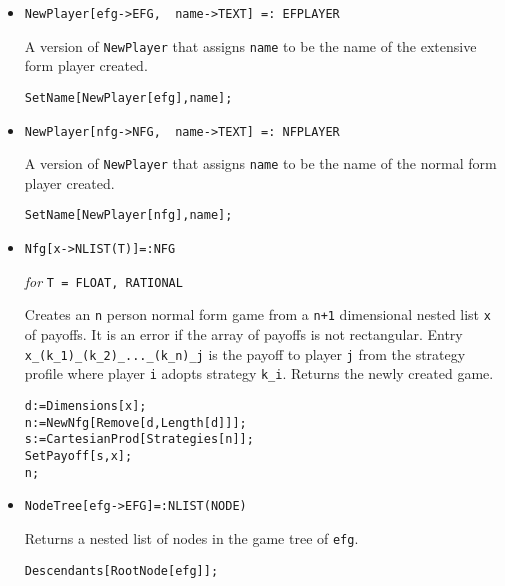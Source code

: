 \begin{itemize}
\item{}
\protect \large \begin{verbatim}
NewPlayer[efg->EFG,  name->TEXT] =: EFPLAYER
\end{verbatim}\normalsize

\bd 
A version of \verb+NewPlayer+ that assigns \verb+name+ to be the name
of the extensive form player created.  
\begin{verbatim}
SetName[NewPlayer[efg],name];
\end{verbatim} 
\ed

\item{}
\protect \large \begin{verbatim}
NewPlayer[nfg->NFG,  name->TEXT] =: NFPLAYER
\end{verbatim}\normalsize

\bd 
A version of \verb+NewPlayer+ that assigns \verb+name+ to be the name
of the normal form player created.  
\begin{verbatim}
SetName[NewPlayer[nfg],name];
\end{verbatim} 
\ed

\item{}
\protect \large \begin{verbatim}
Nfg[x->NLIST(T)]=:NFG
\end{verbatim}\normalsize

{\it for} {\tt T = FLOAT, RATIONAL}
\bd 

Creates an \verb+n+ person normal form game from a \verb&n+1&
dimensional nested list \verb+x+ of payoffs.  It is an error if the
array of payoffs is not rectangular.  Entry
\verb+x_(k_1)_(k_2)_..._(k_n)_j+ is the payoff to player \verb+j+ from
the strategy profile where player \verb+i+ adopts strategy \verb+k_i+.
Returns the newly created game.

\begin{verbatim}
d:=Dimensions[x];
n:=NewNfg[Remove[d,Length[d]]];
s:=CartesianProd[Strategies[n]];
SetPayoff[s,x];
n;
\end{verbatim} 
\ed


\item{}
\protect \large \begin{verbatim}
NodeTree[efg->EFG]=:NLIST(NODE)
\end{verbatim}\normalsize

\bd 
Returns a nested list of nodes in the game tree of \verb+efg+.  
\begin{verbatim}
Descendants[RootNode[efg]];
\end{verbatim} 
\ed


\end{itemize}
